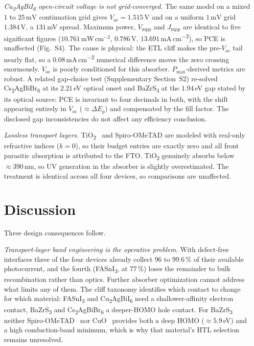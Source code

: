 \documentclass[lettersize,journal]{IEEEtran}
\newcommand{\FASnI}{FASnI\textsubscript{3}}
\newcommand{\CABI}{Cu\textsubscript{2}AgBiI\textsubscript{6}}
\newcommand{\BZS}{BaZrS\textsubscript{3}}
\newcommand{\CABB}{Cs\textsubscript{2}AgBiBr\textsubscript{6}}
\newcommand{\TiOx}{TiO\textsubscript{2}}
\newcommand{\percm}{\,mA\,cm\textsuperscript{$-$2}}
\begin{document}
\emph{\CABI{} open-circuit voltage is not grid-converged.} The same model on a
mixed $1$ to $25\,\mathrm{mV}$ continuation grid gives $V_\mathrm{oc} =
1.515\,$V and on a uniform $1\,\mathrm{mV}$ grid $1.384\,$V, a $131\,$mV
spread. Maximum power, $V_\mathrm{mpp}$ and $J_\mathrm{mpp}$ are identical to
five significant figures ($10.761\,\mathrm{mW\,cm^{-2}}$, $0.786\,$V,
$13.691$\percm), so PCE is unaffected (Fig.~S4). The cause is physical: the ETL cliff
makes the pre-$V_\mathrm{oc}$ tail nearly flat, so a $0.08$\percm{} numerical
difference moves the zero crossing enormously. $V_\mathrm{oc}$ is poorly
conditioned for this absorber. $P_\mathrm{max}$-derived metrics are robust.
A related gap-choice test (Supplementary Section~S2) re-solved \CABB{} at its
$2.21\,$eV optical onset and \BZS{} at the $1.94\,$eV gap stated by its
optical source: PCE is
invariant to four decimals in both, with the shift appearing entirely in
$V_\mathrm{oc}$ (${\approx}\Delta E_g$) and compensated by the fill factor. The disclosed gap inconsistencies do not affect any efficiency conclusion.

\emph{Lossless transport layers.} \TiOx{}~\cite{devore1951} and Spiro-OMeTAD
are modeled with real-only refractive indices ($k=0$), so their budget entries
are exactly zero and all front parasitic absorption is attributed to the FTO.
\TiOx{} genuinely absorbs below $\approx390\,\mathrm{nm}$, so UV generation in
the absorber is slightly overestimated. The treatment is identical across all
four devices, so comparisons are unaffected.

\section{Discussion}
Three design consequences follow.

\emph{Transport-layer band engineering is the operative problem.} With
defect-free interfaces three of the four devices already collect
$96$ to $99.6\,\%$ of their available photocurrent, and the fourth (\FASnI,
at $77\,\%$) loses the remainder to bulk recombination rather than optics.
Further absorber optimization cannot address what limits any of them. The cliff taxonomy identifies which contact to change for which
material: \FASnI{} and \CABI{} need a shallower-affinity electron contact,
\BZS{} and \CABB{} a deeper-HOMO hole contact. For \BZS{} neither
Spiro-OMeTAD~\cite{rahman2023} nor CuO~\cite{elnaggar2024}
provides both a deep HOMO ($\approx5.9\,$eV) and a high conduction-band
minimum, which is why that material's HTL selection remains unresolved.
\end{document}
